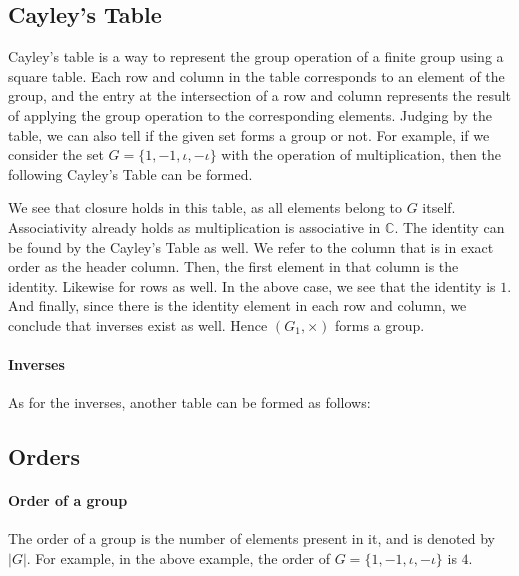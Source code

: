 
\subsection{Cayley's Table}
Cayley's table is a way to represent the group operation of a finite group using a square table. Each row and column in the table corresponds to an element of the group, and the entry at the intersection of a row and column represents the result of applying the group operation to the corresponding elements. Judging by the table, we can also tell if the given set forms a group or not. For example, if we consider the set $G = \{1, -1, \iota, -\iota\}$ with the operation of multiplication, then the following Cayley's Table can be formed.



We see that closure holds in this table, as all elements belong to $G$ itself. Associativity already holds as multiplication is associative in $\mathbb{C}$. The identity can be found by the Cayley's Table as well. We refer to the column that is in exact order as the header column. Then, the first element in that column is the identity. Likewise for rows as well. In the above case, we see that the identity is $1$. And finally, since there is the identity element in each row and column, we conclude that inverses exist as well. Hence $(G_1, \times)$ forms a group.

\paragraph{Inverses}
As for the inverses, another table can be formed as follows:



\subsection{Orders}
\paragraph{Order of a group}
The order of a group is the number of elements present in it, and is denoted by $|G|$. For example, in the above example, the order of $G = \{1, -1, \iota, -\iota\}$ is $4$.
